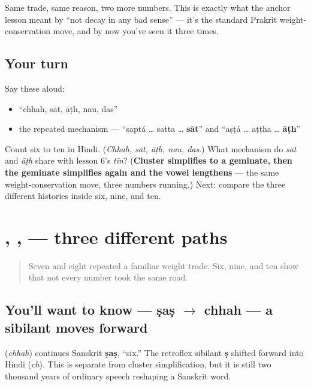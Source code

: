 Same trade, same reason, two more numbers. This is exactly what the anchor lesson meant by \textquotedblleft{}not decay in any bad sense\textquotedblright{} — it's the standard Prakrit weight-conservation move, and by now you've seen it three times.

\subsection*{Your turn}
Say these aloud:

\begin{itemize}
\raggedright
  \item \textquotedblleft{}chhah, sāt, āṭh, nau, das\textquotedblright{}
  \item the repeated mechanism — \textquotedblleft{}saptá … satta … \textbf{sāt}\textquotedblright{} and \textquotedblleft{}aṣṭá … aṭṭha … \textbf{āṭh}\textquotedblright{}
\end{itemize}

\begin{tcolorbox}[breakable,colback=teal!4,colframe=teal!35!black,title={Before you move on}]
Count six to ten in Hindi. (\emph{Chhah, sāt, āṭh, nau, das}.) What mechanism do \emph{sāt} and \emph{āṭh} share with lesson 6's \emph{tīn}? (\textbf{Cluster simplifies to a geminate, then the geminate simplifies again and the vowel lengthens} — the same weight-conservation move, three numbers running.) Next: compare the three different histories inside six, nine, and ten.
\end{tcolorbox}
\section[\texorpdfstring{\hi{छह}, \hi{नौ}, \hi{दस} (chhah, nau, das)}{छह, नौ, दस (chhah, nau, das)}]{, ,  — three different paths}

\label{lesson:HI-C21-six-nine-ten-history}



\begin{quote}
Seven and eight repeated a familiar weight trade. Six, nine, and ten show that not every number took the same road.
\end{quote}

\subsection*{You'll want to know — ṣaṣ $\to$ chhah — a sibilant moves forward}
\textbf{} (\emph{chhah}) continues Sanskrit \textbf{ṣaṣ}, \textquotedblleft{}six.\textquotedblright{} The retroflex sibilant \textbf{ṣ} shifted forward into Hindi \textbf{} (\emph{ch}). This is separate from cluster simplification, but it is still two thousand years of ordinary speech reshaping a Sanskrit word.

